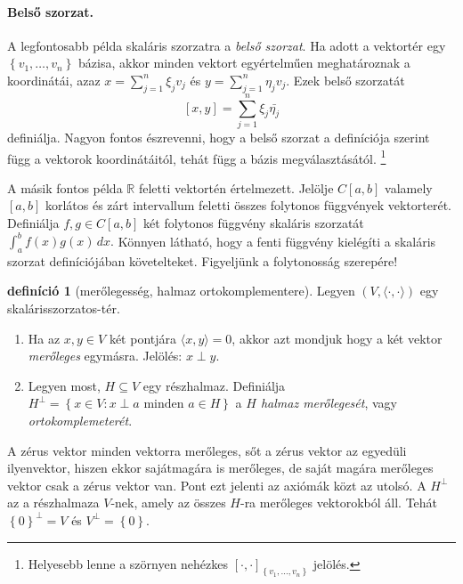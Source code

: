 \documentclass[9pt, a4paper, showtrims]{memoir}
\theoremstyle{plain}
\theoremstyle{remark}
\theoremstyle{definition}
\newtheorem{definition}[proposition]{definíció}
\newcommand{\ip}[2]{\langle#1,#2\rangle}
\begin{document}
\paragraph{Belső szorzat.} A legfontosabb példa skaláris szorzatra a \emph{belső szorzat}.
Ha adott a vektortér egy $\left\{ v_1,\dots,v_n \right\}$ bázisa,
akkor minden vektort egyértelműen meghatároznak a koordinátái,
azaz 
\begin{math}
    x=\sum_{j=1}^n\xi_jv_j
\end{math}
és
\begin{math}
    y=\sum_{j=1}^n\eta_jv_j.
\end{math}
Ezek belső szorzatát 
\begin{displaymath}
    \left[ x,y \right]=\sum_{j=1}^n\xi_j\bar{\eta_j}
\end{displaymath}
definiálja.
Nagyon fontos észrevenni, 
hogy a belső szorzat a definíciója szerint függ a vektorok koordinátáitól, 
tehát függ a bázis megválasztásától.%
\footnote{
    Helyesebb lenne a szörnyen nehézkes 
    $\left[ \cdot,\cdot \right]_{\left\{ v_1,\dots,v_n \right\}}$ jelölés.
}

A másik fontos példa $\mathbb{R}$ feletti vektortén értelmezett.
Jelölje $C\left[ a,b \right]$ valamely $\left[ a,b \right]$ korlátos és zárt intervallum feletti összes folytonos függvények vektorterét.
Definiálja $f,g\in C\left[ a,b \right]$ két folytonos függvény skaláris szorzatát
\begin{math}
    \int_{a}^{b}f\left( x \right)g\left( x \right)\,dx.
\end{math}
Könnyen látható, hogy a fenti függvény kielégíti a skaláris szorzat definíciójában követelteket.
Figyeljünk a folytonosság szerepére!

\begin{definition}[merőlegesség, halmaz ortokomplementere]
    Legyen $\left( V,\ip{\cdot}{\cdot} \right)$ egy skalárisszorzatos-tér.
    \begin{enumerate}
        \item 
            Ha az $x,y\in V$ két pontjára $\ip{x}{y}=0$, 
            akkor azt mondjuk hogy a két vektor \emph{merőleges} egymásra. 
            Jelölés: $x\perp y$.
        \item
            Legyen most, $H\subseteq V$ egy részhalmaz.
            Definiálja
            \(
            H^{\perp}=\left\{ x\in V:x\perp a \text{ minden } a\in H \right\}
            \)
            a \emph{$H$ halmaz merőlegesét}, vagy \emph{ortokomplemeterét}.\qedhere
    \end{enumerate}
\end{definition}
A zérus vektor minden vektorra merőleges, sőt a zérus vektor az egyedüli ilyenvektor, hiszen ekkor sajátmagára is merőleges,
de saját magára merőleges vektor csak a zérus vektor van. 
Pont ezt jelenti az axiómák közt az utolsó.
A $H^\perp$ az a részhalmaza $V$-nek, amely az összes $H$-ra merőleges vektorokból áll.
Tehát $\left\{ 0 \right\}^\perp = V$ és $V^{\perp}=\left\{ 0 \right\}$.
\end{document}
